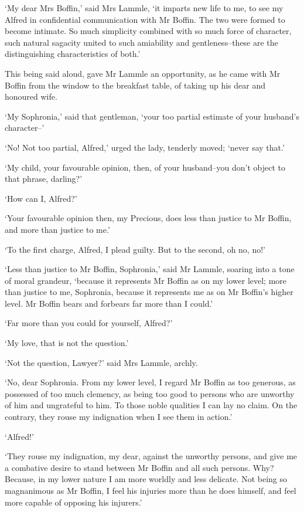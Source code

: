 ‘My dear Mrs Boffin,’ said Mrs Lammle, ‘it imparts new life to me, to
see my Alfred in confidential communication with Mr Boffin. The two
were formed to become intimate. So much simplicity combined with so much
force of character, such natural sagacity united to such amiability and
gentleness--these are the distinguishing characteristics of both.’

This being said aloud, gave Mr Lammle an opportunity, as he came with Mr
Boffin from the window to the breakfast table, of taking up his dear and
honoured wife.

‘My Sophronia,’ said that gentleman, ‘your too partial estimate of your
husband’s character--’

‘No! Not too partial, Alfred,’ urged the lady, tenderly moved; ‘never
say that.’

‘My child, your favourable opinion, then, of your husband--you don’t
object to that phrase, darling?’

‘How can I, Alfred?’

‘Your favourable opinion then, my Precious, does less than justice to Mr
Boffin, and more than justice to me.’

‘To the first charge, Alfred, I plead guilty. But to the second, oh no,
no!’

‘Less than justice to Mr Boffin, Sophronia,’ said Mr Lammle, soaring
into a tone of moral grandeur, ‘because it represents Mr Boffin as on my
lower level; more than justice to me, Sophronia, because it represents
me as on Mr Boffin’s higher level. Mr Boffin bears and forbears far more
than I could.’

‘Far more than you could for yourself, Alfred?’

‘My love, that is not the question.’

‘Not the question, Lawyer?’ said Mrs Lammle, archly.

‘No, dear Sophronia. From my lower level, I regard Mr Boffin as too
generous, as possessed of too much clemency, as being too good to
persons who are unworthy of him and ungrateful to him. To those noble
qualities I can lay no claim. On the contrary, they rouse my indignation
when I see them in action.’

‘Alfred!’

‘They rouse my indignation, my dear, against the unworthy persons,
and give me a combative desire to stand between Mr Boffin and all such
persons. Why? Because, in my lower nature I am more worldly and less
delicate. Not being so magnanimous as Mr Boffin, I feel his injuries
more than he does himself, and feel more capable of opposing his
injurers.’

